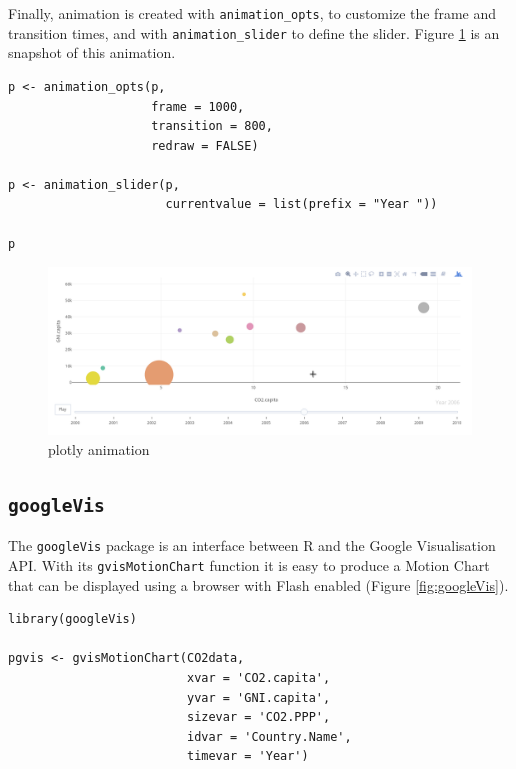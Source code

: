 Finally, animation is created with \texttt{animation\_opts}, to customize the
frame and transition times, and with \texttt{animation\_slider} to define the
slider. Figure \ref{fig:plotly_animation} is an snapshot of this
animation.

\lstset{language=r,label= ,caption= ,captionpos=b,numbers=none}
\begin{lstlisting}
p <- animation_opts(p,
                    frame = 1000,
                    transition = 800,
                    redraw = FALSE)

p <- animation_slider(p,
                      currentvalue = list(prefix = "Year "))

p
\end{lstlisting}

\begin{figure}[htbp]
\centering
\includegraphics[width=.9\linewidth]{figs/plotly_animation.png}
\caption{plotly animation \label{fig:plotly_animation}}
\end{figure}

\subsection{\texttt{googleVis} \label{sec:googlevis}}
\label{sec:orge36543c}
The \texttt{googleVis} package \cite{Gesmann.deCastillo2011} is an interface
between R and the Google Visualisation API. With its \texttt{gvisMotionChart}
function it is easy to produce a Motion Chart that can be displayed
using a browser with Flash enabled (Figure \ref{fig:googleVis}).

\lstset{language=r,label= ,caption= ,captionpos=b,numbers=none}
\begin{lstlisting}
library(googleVis)

pgvis <- gvisMotionChart(CO2data,
                         xvar = 'CO2.capita',
                         yvar = 'GNI.capita',
                         sizevar = 'CO2.PPP',
                         idvar = 'Country.Name',
                         timevar = 'Year')
\end{lstlisting}

